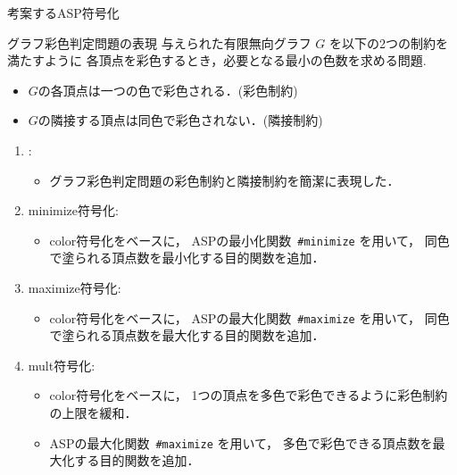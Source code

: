 \documentclass[dvipdfmx,11pt]{beamer}
\begin{document}
\begin{frame}{考案するASP符号化}
 \begin{block}{グラフ彩色判定問題の表現}
  与えられた有限無向グラフ $G$ を以下の2つの制約を満たすように
  各頂点を彩色するとき，必要となる最小の色数を求める問題.%
  \begin{itemize}
   \item $G$の各頂点は一つの色で彩色される．(彩色制約)
   \item $G$の隣接する頂点は同色で彩色されない．(隣接制約)
  \end{itemize}
 \end{block}
 \begin{enumerate}
   \item {}:
         \begin{itemize}
          \item グラフ彩色判定問題の彩色制約と隣接制約を簡潔に表現した．
         \end{itemize}
  \item \alert{minimize符号化}:
        \begin{itemize}
         \item color符号化をベースに，
               ASPの最小化関数~\texttt{\#minimize} を用いて，
	       同色で塗られる頂点数を最小化する目的関数を追加．
        \end{itemize}
  \item \alert{maximize符号化}:
        \begin{itemize}
         \item color符号化をベースに，
               ASPの最大化関数~\texttt{\#maximize} を用いて，
	       同色で塗られる頂点数を最大化する目的関数を追加．
        \end{itemize}
  \item \alert{mult符号化}:
        \begin{itemize}
         \item color符号化をベースに，
	       1つの頂点を多色で彩色できるように彩色制約の上限を緩和．
         \item ASPの最大化関数~\texttt{\#maximize} を用いて，
	       多色で彩色できる頂点数を最大化する目的関数を追加．
        \end{itemize}
 \end{enumerate}
\end{frame}

\end{document}
